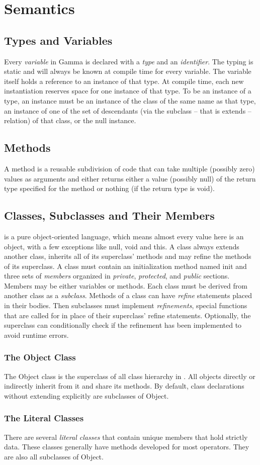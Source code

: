 \section{Semantics}
\subsection{Types and Variables}
Every \textit{variable} in Gamma is declared with a \textit{type} and an \textit{identifier}. The typing is static and will always be known at compile time for every variable. The variable itself holds a reference to an instance of that type. At compile time, each new instantiation reserves space for one instance of that type. To be an instance of a type, an instance must be an instance of the class of the same name as that type, an instance of one of the set of descendants (via the subclass -- that is extends -- relation) of that class, or the null instance.
\subsection{Methods}
A method is a reusable subdivision of code that can take multiple (possibly zero) values as arguments and either returns either a value (possibly null) of the return type specified for the method or nothing (if the return type is void).
\subsection{Classes, Subclasses and Their Members}
\Lang{} is a pure object-oriented language, which means almost every value here is an object, with a few exceptions like null, void and this. A class always extends another class, inherits all of its superclass' methods and may refine the methods of its superclass. A class must contain an initialization method named init and three sets of \textit{members} organized in \textit{private}, \textit{protected}, and \textit{public} sections. Members may be either variables or methods. Each class must be derived from another class as a \textit{subclass}. Methods of a class can have \textit{refine} statements placed in their bodies. Then subclasses must implement \textit{refinements}, special functions that are called for in place of their superclass' refine statements. Optionally, the superclass can conditionally check if the refinement has been implemented to avoid runtime errors.
\subsubsection{The Object Class}
The Object class is the superclass of all class hierarchy in \Lang{}. All objects directly or indirectly inherit from it and share its methods. By default, class declarations without extending explicitly are subclasses of Object.
\subsubsection{The Literal Classes}
There are several \textit{literal classes} that contain unique members that hold strictly data. These classes generally have methods developed for most operators. They are also all subclasses of Object.
